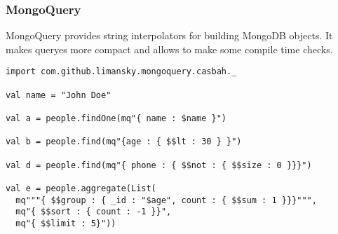 \documentclass[t]{beamer}
\begin{document}
\begin{frame}[fragile]
\frametitle{MongoQuery}
MongoQuery provides string interpolators for building MongoDB objects.  It makes
queryes more compact and allows to make some compile time checks.

\begin{lstlisting}
import com.github.limansky.mongoquery.casbah._

val name = "John Doe"

val a = people.findOne(mq"{ name : $name }")

val b = people.find(mq"{age : { $$lt : 30 } }")

val d = people.find(mq"{ phone : { $$not : { $$size : 0 }}}")

val e = people.aggregate(List(
  mq"""{ $$group : { _id : "$age", count : { $$sum : 1 }}}""",
  mq"{ $$sort : { count : -1 }}",
  mq"{ $$limit : 5}"))
\end{lstlisting}

\end{frame}


\end{document}
